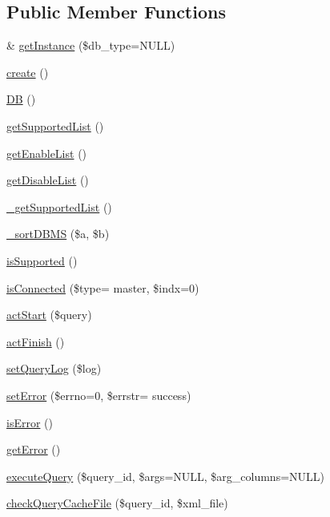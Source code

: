 \subsection*{Public Member Functions}
\begin{DoxyCompactItemize}
\item 
\& \hyperlink{classDB_a16f4a668b6429b4b9af5132cbf885213}{get\+Instance} (\$db\+\_\+type=N\+U\+L\+L)
\item 
\hyperlink{classDB_aad22e845daa75ae9ca9b97f7e3a89749}{create} ()
\item 
\hyperlink{classDB_a29a603c52c10831cddee82518417f992}{D\+B} ()
\item 
\hyperlink{classDB_a82226ac3fc6365c0771b13e389d216cf}{get\+Supported\+List} ()
\item 
\hyperlink{classDB_a0031322267656e8f6bc7f811ca21198b}{get\+Enable\+List} ()
\item 
\hyperlink{classDB_a65508ca8b2bb4ebf6dbb570caf9c8e40}{get\+Disable\+List} ()
\item 
\hyperlink{classDB_a7b0d1af98d9f53968631ca789d6d755c}{\+\_\+get\+Supported\+List} ()
\item 
\hyperlink{classDB_ab0a6d97fa16de74b4d991c9a4d633718}{\+\_\+sort\+D\+B\+M\+S} (\$a, \$b)
\item 
\hyperlink{classDB_a7517481bc9d24ad659f8d347688e481b}{is\+Supported} ()
\item 
\hyperlink{classDB_a217cc2096613d1758a9851f1dd990d71}{is\+Connected} (\$type= \textquotesingle{}master\textquotesingle{}, \$indx=0)
\item 
\hyperlink{classDB_a51a1ba94763a8211495eac18d74c80bb}{act\+Start} (\$query)
\item 
\hyperlink{classDB_a79cad647912ef780e967819e6346a742}{act\+Finish} ()
\item 
\hyperlink{classDB_a0adb7f453d6e8ed2e491d6708be7f9ec}{set\+Query\+Log} (\$log)
\item 
\hyperlink{classDB_af2584546ee78d07a40cc16493f8797cc}{set\+Error} (\$errno=0, \$errstr= \textquotesingle{}success\textquotesingle{})
\item 
\hyperlink{classDB_ab1433763c6378f1085606424a1bfe27c}{is\+Error} ()
\item 
\hyperlink{classDB_a3956fe8725f824d8c0a4f3cba449d6df}{get\+Error} ()
\item 
\hyperlink{classDB_a2ac8db06615a3ded603d42c731a67ee3}{execute\+Query} (\$query\+\_\+id, \$args=N\+U\+L\+L, \$arg\+\_\+columns=N\+U\+L\+L)
\item 
\hyperlink{classDB_a0bbeb84cee13c54916b7f9aac6db4791}{check\+Query\+Cache\+File} (\$query\+\_\+id, \$xml\+\_\+file)

\end{DoxyCompactItemize}
